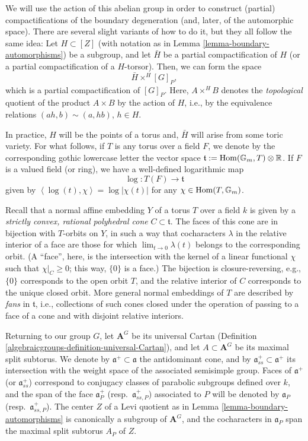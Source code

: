 We will use the action of this abelian group in order to construct (partial) compactifications of the boundary degeneration (and, later, of the automorphic space). There are several slight variants of how to do it, but they all follow the same idea: Let $H\subset [Z]$ (with notation as in Lemma \ref{lemma-boundary-automorphisms}) be a subgroup, and let $\bar H$ be a partial compactification of $H$ (or a partial compactification of a $H$-torsor). Then, we can form the space 
$$\bar H \times^H [G]_P,$$
which is a partial compactification of $[G]_P$. Here, $A\times^H B$ denotes the \emph{topological} quotient of the product $A\times B$ by the action of $H$, i.e., by the equivalence relations $(ah,b) \sim (a, hb)$, $h\in H$.

In practice, $H$ will be the points of a torus and, $\bar H$ will arise from some toric variety. 
For what follows, if $T$ is any torus over a field $F$, we denote by the corresponding gothic lowercase letter the vector space $\mathfrak t:= \mathop{\rm Hom}\nolimits(\mathbb G_m, T) \otimes \mathbb R$. If $F$ is a valued field (or ring), we have a well-defined logarithmic map
\begin{equation}\label{logmap}
\log: T(F)\to \mathfrak t
\end{equation}
given by $\left<\log(t), \chi\right> = \log|\chi(t)|$ for any $\chi\in \mathop{\rm Hom}\nolimits(T,\mathbb G_m)$.

Recall that a normal affine embedding $Y$ of a torus $T$ over a field $k$ is given by a \emph{strictly convex, rational polyhedral cone} $C\subset \mathfrak t$. The faces of this cone are in bijection with $T$-orbits on $Y$, in such a way that cocharacters $\lambda$ in the relative interior of a face are those for which $\lim_{t\to 0} \lambda(t)$ belongs to the corresponding orbit. (A ``face'', here, is the intersection with the kernel of a linear functional $\chi$ such that $\chi|_C \ge 0$; this way, $\{0\}$ is a face.) The bijection is closure-reversing, e.g., $\{0\}$ corresponds to the open orbit $T$, and the relative interior of $C$ corresponds to the unique closed orbit. More general normal embeddings of $T$ are described by \emph{fans} in $\mathfrak t$, i.e., collections of such cones closed under the operation of passing to a face of a cone and with disjoint relative interiors. 

Returning to our group $G$, let $\mathbf A^G$ be its universal Cartan (Definition \ref{algebraicgroups-definition-universal-Cartan}), and let $A\subset \mathbf A^G$ be its maximal split subtorus. 
We denote by $\mathfrak a^+\subset \mathfrak a$ the antidominant cone, and by $\mathfrak a^+_{ss}\subset \mathfrak a^+$ its intersection with the weight space of the associated semisimple group. Faces of $\mathfrak a^+$ (or $\mathfrak a^+_{ss}$) correspond to conjugacy classes of parabolic subgroups defined over $k$, and the span of the face $\mathfrak a_P^+$ (resp.\ $\mathfrak a_{ss,P}^+$) associated to $P$ will be denoted by $\mathfrak a_P$ (resp.\ $\mathfrak a_{ss,P}^+$). The center $Z$ of a Levi quotient as in Lemma \ref{lemma-boundary-automorphisms} is canonically a subgroup of $\mathbf A^G$, and the cocharacters in $\mathfrak a_P$ span the maximal split subtorus $A_P$ of $Z$.

